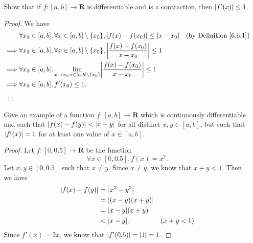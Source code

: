 \begin{exercise}\label{ex 6.6.2}
    Show that if \(f : [a, b] \to \mathbf{R}\) is differentiable and is a contraction, then \(\abs*{f'(x)} \leq 1\).
\end{exercise}

\begin{proof}
    We have
    \begin{align*}
                 & \forall x_0 \in [a, b], \forall x \in [a, b] \setminus \{x_0\}, \abs*{f(x) - f(x_0)} \leq \abs*{x - x_0}              & \text{(by Definition \ref{6.6.1})} \\
        \implies & \forall x_0 \in [a, b], \forall x \in [a, b] \setminus \{x_0\}, \abs*{\frac{f(x) - f(x_0)}{x - x_0}} \leq 1                                                \\
        \implies & \forall x_0 \in [a, b], \lim_{x \to x_0 ; x \in [a, b] \setminus \{x_0\}} \abs*{\frac{f(x) - f(x_0)}{x - x_0}} \leq 1                                      \\
        \implies & \forall x_0 \in [a, b], f'(x_0) \leq 1.
    \end{align*}
\end{proof}

\begin{exercise}\label{ex 6.6.3}
    Give an example of a function \(f : [a, b] \to \mathbf{R}\) which is continuously differentiable and such that \(\abs*{f(x) - f(y)} < \abs*{x - y}\) for all distinct \(x, y \in [a, b]\), but such that \(\abs*{f'(x)} = 1\) for at least one value of \(x \in [a, b]\).
\end{exercise}

\begin{proof}
    Let \(f : [0, 0.5] \to \mathbf{R}\) be the function
    \[
        \forall x \in [0, 0.5], f(x) = x^2.
    \]
    Let \(x, y \in [0, 0.5]\) such that \(x \neq y\).
    Since \(x \neq y\), we know that \(x + y < 1\).
    Then we have
    \begin{align*}
        \abs*{f(x) - f(y)} & = \abs*{x^2 - y^2}                    \\
                           & = \abs*{(x - y)(x + y)}               \\
                           & = \abs*{x - y} (x + y)                \\
                           & < \abs*{x - y}.         & (x + y < 1)
    \end{align*}
    Since \(f'(x) = 2x\), we know that \(\abs*{f'(0.5)} = \abs*{1} = 1\).
\end{proof}

